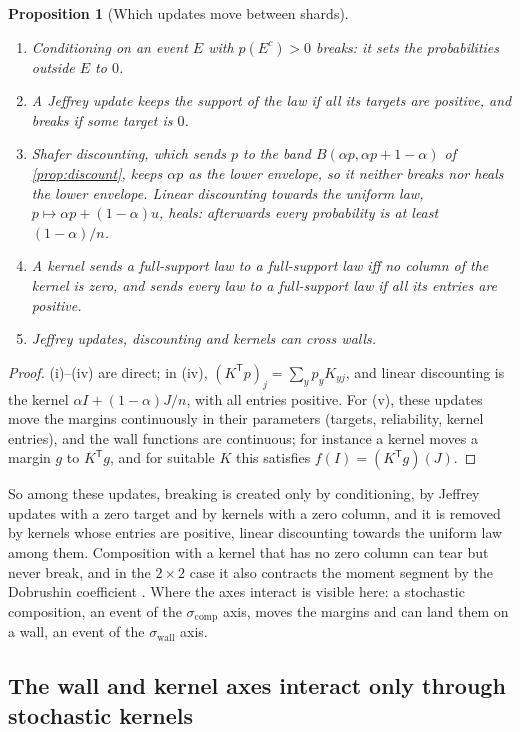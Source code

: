 \documentclass[11pt]{article}
\newtheorem{proposition}[theorem]{Proposition}
\theoremstyle{definition}
\theoremstyle{remark}
\newcommand{\T}{\mathsf T}
\begin{document}
\begin{proposition}[Which updates move between shards]\label{prop:updateregimes}
\begin{enumerate}[label=(\roman*)]
\item Conditioning on an event $E$ with $p(E^c)>0$ breaks: it sets the probabilities outside $E$ to $0$.
\item A Jeffrey update keeps the support of the law if all its targets are positive, and breaks if some target is $0$.
\item Shafer discounting, which sends $p$ to the band $B(\alpha p,\alpha p+1-\alpha)$ of \cref{prop:discount}, keeps $\alpha p$ as the lower
  envelope, so it neither breaks nor heals the lower envelope. Linear discounting towards the uniform law, $p\mapsto\alpha p+(1-\alpha)u$, heals:
  afterwards every probability is at least $(1-\alpha)/n$.
\item A kernel sends a full-support law to a full-support law iff no column of the kernel is zero, and sends every law to a full-support
  law if all its entries are positive.
\item Jeffrey updates, discounting and kernels can cross walls.
\end{enumerate}
\end{proposition}
\begin{proof}
(i)--(iv) are direct; in (iv), $(K^\T p)_j=\sum_yp_yK_{yj}$, and linear discounting is the kernel $\alpha I+(1-\alpha)J/n$, with all entries
positive. For (v), these updates move the margins continuously in their parameters (targets, reliability, kernel entries), and the wall
functions are continuous; for instance a kernel moves a margin $g$ to $K^\T g$, and for suitable $K$ this satisfies $f(I)=(K^\T g)(J)$.
\end{proof}

So among these updates, breaking is created only by conditioning, by Jeffrey updates with a zero target and by kernels with a zero
column, and it is removed by kernels whose entries are positive, linear discounting towards the uniform law among them. Composition
with a kernel that has no zero column can tear but never break, and in the $2\times2$ case it also contracts the moment segment by the
Dobrushin coefficient \cite[Ex.~6.2]{Bridges}. Where the axes interact is visible here: a stochastic composition, an event of the
$\sigma_{\mathrm{comp}}$ axis, moves the margins and can land them on a wall, an event of the $\sigma_{\mathrm{wall}}$ axis.

\subsection{The wall and kernel axes interact only through stochastic kernels}
\end{document}
